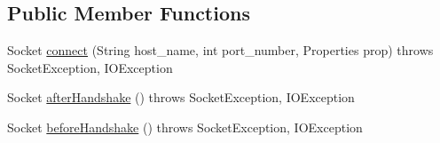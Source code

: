 \subsection*{Public Member Functions}
\begin{DoxyCompactItemize}
\item 
Socket \mbox{\hyperlink{classtestsuite_1_1_unreliable_socket_factory_aa23b6bb1ed436f99adc8e51f6b86d641}{connect}} (String host\+\_\+name, int port\+\_\+number, Properties prop)  throws Socket\+Exception, I\+O\+Exception 
\item 
Socket \mbox{\hyperlink{classtestsuite_1_1_unreliable_socket_factory_ab50d6b1a289f6f7205ab9ee2a2492673}{after\+Handshake}} ()  throws Socket\+Exception, I\+O\+Exception 
\item 
Socket \mbox{\hyperlink{classtestsuite_1_1_unreliable_socket_factory_ad65b14e35905d6b36bf1e93c5b0c90e2}{before\+Handshake}} ()  throws Socket\+Exception, I\+O\+Exception 
\end{DoxyCompactItemize}
